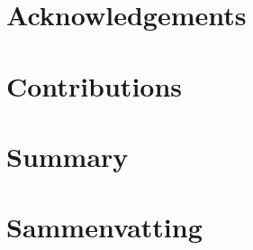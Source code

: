 \documentclass[british,a4paper]{book}
\begin{document}
\appendix
{}

\chapter{Acknowledgements}
\label{chapter:acknowledgements}


\chapter{Contributions}
\label{chapter:contributions}


\backmatter
\fancyhead[RE]{}




\chapter{Summary}

\chapter{Sammenvatting}




\end{document}
